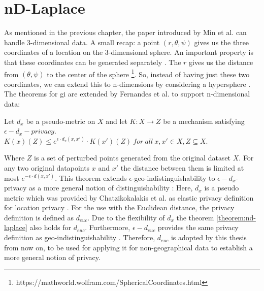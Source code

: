 \section{nD-Laplace}
As mentioned in the previous chapter, the paper introduced by Min et al. can handle 3-dimensional data.
A small recap: a point $(r, \theta, \psi)$ gives us the three coordinates of a location on the 3-dimensional sphere.
An important property is that these coordinates can be generated separately \citep{DBLP:journals/corr/abs-1212-1984, 9646489}.
The $r$ gives us the distance from $(\theta, \psi)$ to the center of the sphere \footnote{https://mathworld.wolfram.com/SphericalCoordinates.html}.
So, instead of having just these two coordinates, we can extend this to n-dimensions by considering a hypersphere \citep{fernandes_generalised_2019, 9646489}.
The theorems for \gls{gi} are extended by Fernandes et al. to support n-dimensional data:
\begin{theorem}
  Let $d_x$ be a pseudo-metric on $X$ and let $K: X \rightarrow Z$ be a mechanism satisfying $\epsilon-d_x-privacy$. \\
  $K(x)(Z) \leq e^{\epsilon \cdot d_x (x, x')} \cdot K(x')(Z) \ for \ all \ x, x' \in X, Z \subseteq X$.
  \label{theorem:nd-laplace}
\end{theorem}
Where $Z$ is a set of perturbed points generated from the original dataset $X$. 
For any two original datapoints $x$ and $x'$ the distance between them is limited at most $e^{-\epsilon \cdot d(x, x')}$. 
This theorem extends $\epsilon$-geo-indistinguishability to $\epsilon-d_x$-privacy as a more general notion of distinguishability \citep{fernandes_generalised_2019}:
Here, $d_x$ is a pseudo metric which was provided by Chatzikokalakis et al. as elastic privacy definition for location privacy \citep{chatzikokolakis_constructing_2015}. For the use with the Euclidean distance, the privacy definition is defined as $d_{euc}$. Due to the flexibility of $d_x$ the theorem \ref{theorem:nd-laplace} also holds for $d_{euc}$.  Furthermore, $\epsilon-d_{euc}$ provides the same privacy definition as geo-indistinguishability \citep{chatzikokolakis_constructing_2015}.
Therefore, $d_{euc}$ is adopted by this thesis from now on, to be used for applying it for non-geographical data to establish a more general notion of privacy. \newline

